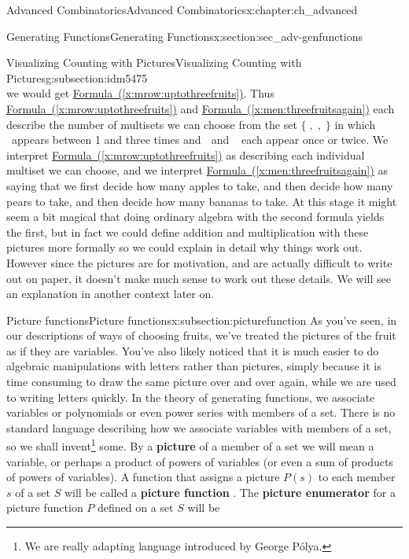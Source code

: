 \documentclass[oneside,10pt,]{book}
\newcommand{\terminology}[1]{\textbf{#1}}
\numberwithin{equation}{chapter}
\newcommand{\apple}{\text{🍎}}
\newcommand{\ap}{\apple}
\newcommand{\banana}{\text{🍌}}
\newcommand{\ba}{\banana}
\newcommand{\pear}{\text{🍐}}
\newcommand{\pe}{\pear}
\begin{document}
\begin{chapterptx}{Advanced Combinatorics}{}{Advanced Combinatorics}{}{}{x:chapter:ch_advanced}
\begin{sectionptx}{Generating Functions}{}{Generating Functions}{}{}{x:section:sec_adv-genfunctions}
\begin{subsectionptx}{Visualizing Counting with Pictures}{}{Visualizing Counting with Pictures}{}{}{g:subsection:idm5475}
\begin{equation}
\end{equation}
we would get \hyperref[x:mrow:uptothreefruits]{Formula~(\ref{x:mrow:uptothreefruits})}. Thus \hyperref[x:mrow:uptothreefruits]{Formula~(\ref{x:mrow:uptothreefruits})} and \hyperref[x:men:threefruitsagain]{Formula~(\ref{x:men:threefruitsagain})} each describe the number of multisets we can choose from the set \(\{\ap,\pe,\ba\}\) in which \(\apple\)~appears between 1 and three times and \(\pear\) and \(\banana\)~each appear once or twice. We interpret \hyperref[x:mrow:uptothreefruits]{Formula~(\ref{x:mrow:uptothreefruits})} as describing each individual multiset we can choose, and we interpret \hyperref[x:men:threefruitsagain]{Formula~(\ref{x:men:threefruitsagain})} as saying that we first decide how many apples to take, and then decide how many pears to take, and then decide how many bananas to take. At this stage it might seem a bit magical that doing ordinary algebra with the second formula yields the first, but in fact we could define addition and multiplication with these pictures more formally so we could explain in detail why things work out. However since the pictures are for motivation, and are actually difficult to write out on paper, it doesn't make much sense to work out these details. We will see an explanation in another context later on.%
\end{subsectionptx}
%
%
\typeout{************************************************}
\typeout{************************************************}
%
\begin{subsectionptx}{Picture functions}{}{Picture functions}{}{}{x:subsection:picturefunction}
As you've seen, in our descriptions of ways of choosing fruits, we've treated the pictures of the fruit as if they are variables. You've also likely noticed that it is much easier to do algebraic manipulations with letters rather than pictures, simply because it is time consuming to draw the same picture over and over again, while we are used to writing letters quickly. In the theory of generating functions, we associate variables or polynomials or even power series with members of a set. There is no standard language describing how we associate variables with members of a set, so we shall invent\footnote{We are really adapting language introduced by George Pólya.\label{g:fn:idm5546}} some. By a \terminology{picture} of a member of a set we will mean a variable, or perhaps a product of powers of variables (or even a sum of products of powers of variables). A function that assigns a picture \(P(s)\) to each member \(s\) of a set \(S\) will be called a \terminology{picture function} . The \terminology{picture enumerator} for a picture function \(P\) defined on a set \(S\) will be%

\end{subsectionptx}
\end{sectionptx}
\end{chapterptx}
\end{document}
